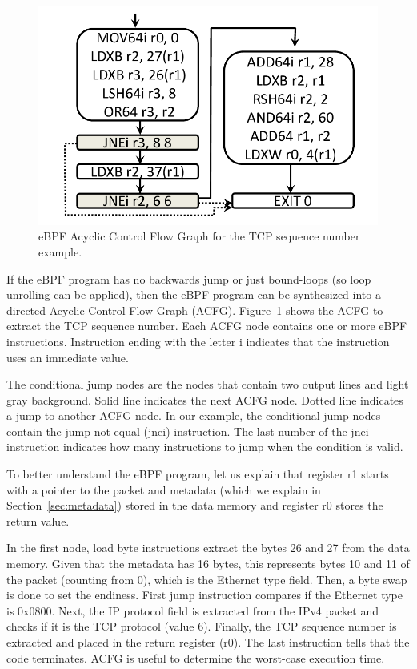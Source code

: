 \begin{figure}[htb]
\centering
\includegraphics[width=.8\linewidth]{figures/eBPFACFG.pdf}
\caption{eBPF Acyclic Control Flow Graph for the TCP sequence number example.}
\label{fig:acfg}
\end{figure}

If the eBPF program has no backwards jump or just bound-loops (so loop unrolling can be applied), then the eBPF program can be synthesized into a directed Acyclic Control Flow Graph (ACFG). 
Figure~\ref{fig:acfg} shows the ACFG to extract the TCP sequence number.%
Each ACFG node contains one or more eBPF instructions. Instruction ending with the letter i indicates that the instruction uses an immediate value.

The conditional jump nodes are the nodes that contain two output lines and light gray background.
Solid line indicates the next ACFG node. Dotted line indicates a jump to another ACFG node.
In our example, the conditional jump nodes contain the jump not equal (jnei) instruction.
The last number of the jnei instruction indicates how many instructions to jump when the condition is valid.

To better understand the eBPF program, let us explain that register r1 starts with a pointer to the packet and metadata (which we explain in Section~\ref{sec:metadata}) stored in the data memory and register r0 stores the return value.

In the first node, load byte instructions extract the bytes 26 and 27 from the data memory.
Given that the metadata has 16 bytes, this represents bytes 10 and 11 of the packet (counting from 0), which is the Ethernet type field. Then, a byte swap is done to set the endiness. 
First jump instruction compares if the Ethernet type is 0x0800. Next, the IP protocol field is extracted from the IPv4 packet and checks if it is the TCP protocol (value 6). Finally, the TCP sequence number is extracted and placed in the return register (r0). The last instruction tells that the code terminates.
ACFG is useful to determine the worst-case execution time.




